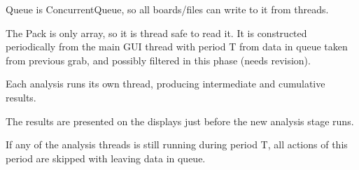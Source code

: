 Queue is ConcurrentQueue, so all boards/files can write to it from threads.

The Pack is only array, so it is thread safe to read it. It is constructed
periodically from the main GUI thread with period T from data in queue taken
from previous grab, and possibly filtered in this phase (needs revision).

Each analysis runs its own thread, producing intermediate and cumulative results.

The results are presented on the displays just before the new analysis stage runs.

If any of the analysis threads is still running during period T, all actions of
this period are skipped with leaving data in queue.